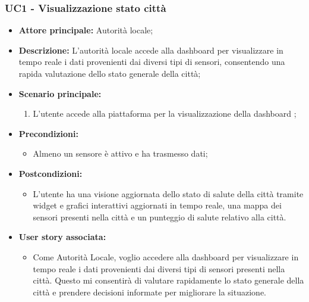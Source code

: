 \documentclass{article}
\begin{document}
\subsubsection{UC1 - Visualizzazione stato città}
\begin{itemize}
    \item \textbf{Attore principale:} Autorità locale;
    \item \textbf{Descrizione:} L'autorità locale accede alla dashboard per visualizzare in tempo reale i dati provenienti dai diversi tipi di sensori, consentendo una rapida valutazione dello stato generale della città;
    \item \textbf{Scenario principale:}
          \begin{enumerate}
              \item L'utente accede alla piattaforma per la visualizzazione della dashboard ;
          \end{enumerate}
    \item \textbf{Precondizioni:}
          \begin{itemize}
              \item  Almeno un sensore è attivo e ha trasmesso dati;
          \end{itemize}
    \item \textbf{Postcondizioni:}
          \begin{itemize}
              \item      L'utente ha una visione aggiornata dello stato di salute della città tramite widget e grafici interattivi aggiornati in tempo reale, una mappa dei sensori presenti nella città e un punteggio di salute relativo alla città.
          \end{itemize}
    \item \textbf{User story associata:}
          \begin{itemize}
              \item Come Autorità Locale, voglio accedere alla dashboard per visualizzare in tempo reale i dati provenienti dai diversi tipi di sensori presenti nella città. Questo mi consentirà di valutare rapidamente lo stato generale della città e prendere decisioni informate per migliorare la situazione.
          \end{itemize}
\end{itemize}
\end{document}
